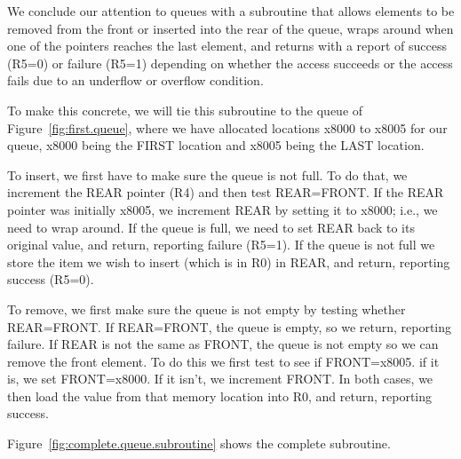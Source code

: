 \documentclass{patt}
\begin{document}
We conclude our attention to queues with a subroutine that allows elements
to be removed from the front or inserted into the rear of the queue, wraps 
around when one of the pointers reaches the last element, and returns with a
report of success (R5=0) or failure (R5=1) depending on whether the access 
succeeds or the access fails due to an underflow or overflow condition.

To make this concrete, we will tie this subroutine to the queue of 
Figure~\ref{fig:first.queue}, where we have allocated locations x8000 to
x8005 for our queue, x8000 being the FIRST location and x8005 being the
LAST location.

To insert, we first have to make sure the queue is not full.  To do that, we
increment the REAR pointer (R4) and then test REAR=FRONT.  If the REAR pointer 
was initially x8005, we increment REAR by setting it to x8000; i.e., we need to
wrap around.  If the queue is full, we need to set REAR back to its original 
value, and return, reporting failure (R5=1).  If the queue is not full we 
store the item we wish to insert (which is in R0) in REAR, and return, 
reporting success (R5=0).

To remove, we first make sure the queue is not empty by testing whether
REAR=FRONT.  If REAR=FRONT, the queue is empty, so we return, reporting failure.
If REAR is not the same as FRONT, the queue is not empty so we can remove the
front element.  To do this we first test to see if FRONT=x8005. if it is, we
set FRONT=x8000.  If it isn't, we increment FRONT.  In both cases, we then
load the value from that memory location into R0, and return, reporting success.

Figure~\ref{fig:complete.queue.subroutine} shows the complete subroutine.
\end{document}
